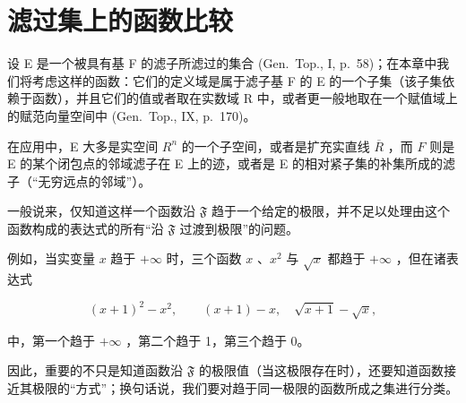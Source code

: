 \section{滤过集上的函数比较}

设 E 是一个被具有基 F 的滤子所滤过的集合 (Gen.~Top., I, p.~58)；在本章中我们将考虑这样的函数：它们的定义域是属于滤子基 F 的 E 的一个子集（该子集依赖于函数），并且它们的值或者取在实数域 R 中，或者更一般地取在一个赋值域上的赋范向量空间中 (Gen.~Top., IX, p.~170)。

在应用中，E 大多是实空间 \(R^{n}\) 的一个子空间，或者是扩充实直线 \(\overline{R}\) ，而 \(F\) 则是 E 的某个闭包点的邻域滤子在 E 上的迹，或者是 E 的相对紧子集的补集所成的滤子（“无穷远点的邻域”）。

一般说来，仅知道这样一个函数沿 \(\mathfrak{F}\) 趋于一个给定的极限，并不足以处理由这个函数构成的表达式的所有“沿 \(\mathfrak{F}\) 过渡到极限”的问题。

例如，当实变量 \(x\) 趋于 \(+\infty\) 时，三个函数 \(x\) 、\(x^2\) 与 \(\sqrt{x}\) 都趋于 \(+\infty\) ，但在诸表达式

\[
(x + 1) ^ {2} - x ^ {2}, \qquad (x + 1) - x, \quad \sqrt {x + 1} - \sqrt {x},
\]

中，第一个趋于 \(+\infty\) ，第二个趋于 1，第三个趋于 0。

因此，重要的不只是知道函数沿 \(\mathfrak{F}\) 的极限值（当这极限存在时），还要知道函数接近其极限的“方式”；换句话说，我们要对趋于同一极限的函数所成之集进行分类。
\relax{}
